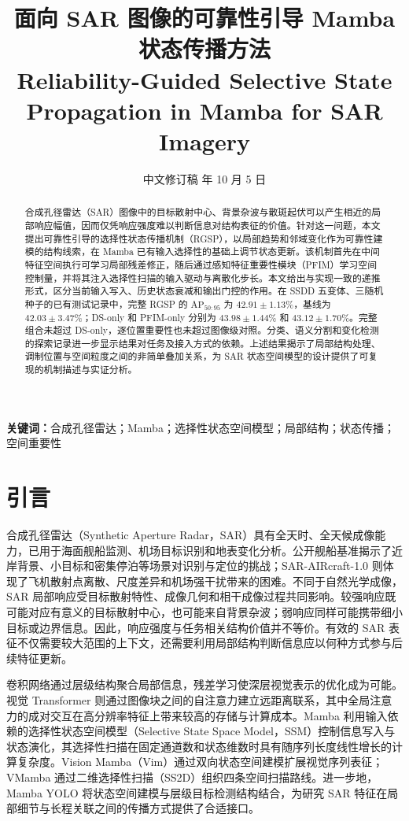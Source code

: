 \documentclass[UTF8,11pt,a4paper,fontset=fandol]{ctexart}
\title{面向 SAR 图像的可靠性引导 Mamba 状态传播方法\\[0.5em]
\large Reliability-Guided Selective State Propagation in Mamba for SAR Imagery}
\author{}
\date{中文修订稿 \quad 2026 年 10 月 5 日}
\newcommand{\ap}{\mathrm{AP}}
\begin{document}
\maketitle

\begin{abstract}
合成孔径雷达（SAR）图像中的目标散射中心、背景杂波与散斑起伏可以产生相近的局部响应幅值，因而仅凭响应强度难以判断信息对结构表征的价值。针对这一问题，本文提出可靠性引导的选择性状态传播机制（RGSP），以局部趋势和邻域变化作为可靠性建模的结构线索，在 Mamba 已有输入选择性的基础上调节状态更新。该机制首先在中间特征空间执行可学习局部残差修正，随后通过感知特征重要性模块（PFIM）学习空间控制量，并将其注入选择性扫描的输入驱动与离散化步长。本文给出与实现一致的递推形式，区分当前输入写入、历史状态衰减和输出门控的作用。在 SSDD 五变体、三随机种子的已有测试记录中，完整 RGSP 的 $\ap_{50:95}$ 为 $42.91\pm1.13\%$，基线为 $42.03\pm3.47\%$；DS-only 和 PFIM-only 分别为 $43.98\pm1.44\%$ 和 $43.12\pm1.70\%$。完整组合未超过 DS-only，逐位置重要性也未超过图像级对照。分类、语义分割和变化检测的探索记录进一步显示结果对任务及接入方式的依赖。上述结果揭示了局部结构处理、调制位置与空间粒度之间的非简单叠加关系，为 SAR 状态空间模型的设计提供了可复现的机制描述与实证分析。
\end{abstract}
\noindent\textbf{关键词：}合成孔径雷达；Mamba；选择性状态空间模型；局部结构；状态传播；空间重要性

\section{引言}\label{sec:intro}
合成孔径雷达（Synthetic Aperture Radar，SAR）具有全天时、全天候成像能力，已用于海面舰船监测、机场目标识别和地表变化分析。公开舰船基准揭示了近岸背景、小目标和密集停泊等场景对识别与定位的挑战\cite{ssdd2021}；SAR-AIRcraft-1.0 则体现了飞机散射点离散、尺度差异和机场强干扰带来的困难\cite{saraircraft2023}。不同于自然光学成像，SAR 局部响应受目标散射特性、成像几何和相干成像过程共同影响。较强响应既可能对应有意义的目标散射中心，也可能来自背景杂波；弱响应同样可能携带细小目标或边界信息。因此，响应强度与任务相关结构价值并不等价。有效的 SAR 表征不仅需要较大范围的上下文，还需要利用局部结构判断信息应以何种方式参与后续特征更新。

卷积网络通过层级结构聚合局部信息，残差学习使深层视觉表示的优化成为可能\cite{resnet2015}。视觉 Transformer 则通过图像块之间的自注意力建立远距离联系\cite{vit2020}，其中全局注意力的成对交互在高分辨率特征上带来较高的存储与计算成本。Mamba 利用输入依赖的选择性状态空间模型（Selective State Space Model，SSM）控制信息写入与状态演化，其选择性扫描在固定通道数和状态维数时具有随序列长度线性增长的计算复杂度\cite{mamba2023}。Vision Mamba（Vim）通过双向状态空间建模扩展视觉序列表征\cite{vim2024}；VMamba 通过二维选择性扫描（SS2D）组织四条空间扫描路线\cite{vmamba2024}。进一步地，Mamba YOLO 将状态空间建模与层级目标检测结构结合\cite{mambayolo2024}，为研究 SAR 特征在局部细节与长程关联之间的传播方式提供了合适接口。
\end{document}
